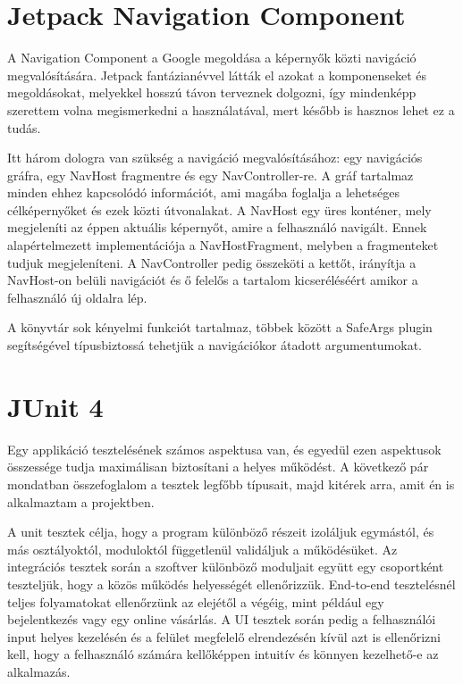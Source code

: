 \section{Jetpack Navigation Component}

A Navigation Component a Google megoldása a képernyők közti navigáció megvalósítására. Jetpack fantázianévvel látták el azokat a komponenseket és megoldásokat, melyekkel hosszú távon terveznek dolgozni, így mindenképp szerettem volna megismerkedni a használatával, mert később is hasznos lehet ez a tudás. 

Itt három dologra van szükség a navigáció megvalósításához: egy navigációs gráfra, egy NavHost fragmentre és egy NavController-re. A gráf tartalmaz minden ehhez kapcsolódó információt, ami magába foglalja a lehetséges célképernyőket és ezek közti útvonalakat. A NavHost egy üres konténer, mely megjeleníti az éppen aktuális képernyőt, amire a felhasználó navigált. Ennek alapértelmezett implementációja a NavHostFragment, melyben a fragmenteket tudjuk megjeleníteni. A NavController pedig összeköti a kettőt, irányítja a NavHost-on belüli navigációt és ő felelős a tartalom kicseréléséért amikor a felhasználó új oldalra lép. 

A könyvtár sok kényelmi funkciót tartalmaz, többek között a SafeArgs plugin segítségével típusbiztossá tehetjük a navigációkor átadott argumentumokat. \cite{Navigation}

\section{JUnit 4}

Egy applikáció tesztelésének számos aspektusa van, és egyedül ezen aspektusok összessége tudja maximálisan biztosítani a helyes működést. A következő pár mondatban összefoglalom a tesztek legfőbb típusait, majd kitérek arra, amit én is alkalmaztam a projektben.

 A unit tesztek célja, hogy a program különböző részeit izoláljuk egymástól, és más osztályoktól, moduloktól függetlenül validáljuk a működésüket. Az integrációs tesztek során a szoftver különböző moduljait együtt egy csoportként teszteljük, hogy a közös működés helyességét ellenőrizzük.\cite{IntegrationTest} End-to-end tesztelésnél teljes folyamatokat ellenőrzünk az elejétől a végéig, mint például egy bejelentkezés vagy egy online vásárlás.\cite{EndtoEndTest} A UI tesztek során pedig a felhasználói input helyes kezelésén és a felület megfelelő elrendezésén kívül azt is ellenőrizni kell, hogy a felhasználó számára kellőképpen intuitív és könnyen kezelhető-e az alkalmazás.\cite{UITest}

